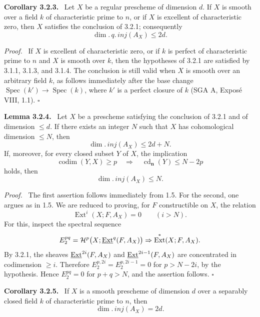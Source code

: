 \documentclass[11pt]{article}
\theoremstyle{plain}
\theoremstyle{definition}
\theoremstyle{remark}
\newenvironment{statement}[1]{\par\medskip\noindent\textbf{#1.}\ }{\par\medskip}
\newenvironment{prooftext}{\par\noindent\textit{Proof.}\ }{\par\medskip}
\DeclareMathOperator{\Spec}{Spec}
\DeclareMathOperator{\Ext}{Ext}
\DeclareMathOperator{\codim}{codim}
\DeclareMathOperator{\cd}{cd}
\newcommand{\qedtext}{\hfill$\square$}
\providecommand{\codim}{\operatorname{codim}}
\begin{document}
\begin{statement}{Corollary 3.2.3}
Let $X$ be a regular prescheme of dimension $d$. If $X$ is smooth over a field $k$ of characteristic prime to $n$, or if $X$ is excellent of characteristic zero, then $X$ satisfies the conclusion of 3.2.1; consequently
\[
   \dim.\,q.\,inj(A_X)\le 2d.
\]
\end{statement}

\begin{prooftext}
If $X$ is excellent of characteristic zero, or if $k$ is perfect of characteristic prime to $n$ and $X$ is smooth over $k$, then the hypotheses of 3.2.1 are satisfied by 3.1.1, 3.1.3, and 3.1.4. The conclusion is still valid when $X$ is smooth over an arbitrary field $k$, as follows immediately after the base change $\Spec(k')\to\Spec(k)$, where $k'$ is a perfect closure of $k$ (SGA A, Exposé VIII, 1.1). \qedtext
\end{prooftext}

\begin{statement}{Lemma 3.2.4}
Let $X$ be a prescheme satisfying the conclusion of 3.2.1 and of dimension $\le d$. If there exists an integer $N$ such that $X$ has cohomological dimension $\le N$, then
\[
   \dim.\,inj(A_X)\le 2d+N.
\]
If, moreover, for every closed subset $Y$ of $X$, the implication
\[
   \codim(Y,X)\ge p \quad\Rightarrow\quad \cd_{\mathbf n}(Y)\le N-2p
\]
holds, then
\[
   \dim.\,inj(A_X)\le N.
\]
\end{statement}

\begin{prooftext}
The first assertion follows immediately from 1.5. For the second, one argues as in 1.5. We are reduced to proving, for $F$ constructible on $X$, the relation
\[
   \Ext^i(X;F,A_X)=0\qquad(i>N).
\]
For this, inspect the spectral sequence
\[
   E_2^{pq}=\Hh^p\bigl(X;\uExt^q(F,A_X)\bigr)
      \Rightarrow \Ext^*(X;F,A_X).
\]
By 3.2.1, the sheaves $\underline{\operatorname{Ext}}^{2i}(F,A_X)$ and $\underline{\operatorname{Ext}}^{2i-1}(F,A_X)$ are concentrated in codimension $\ge i$. Therefore $E_2^{p,2i}=E_2^{p,2i-1}=0$ for $p>N-2i$, by the hypothesis. Hence $E_2^{pq}=0$ for $p+q>N$, and the assertion follows. \qedtext
\end{prooftext}

\begin{statement}{Corollary 3.2.5}
If $X$ is a smooth prescheme of dimension $d$ over a separably closed field $k$ of characteristic prime to $n$, then
\[
   \dim.\,inj(A_X)=2d.
\]
\end{statement}
\end{document}
